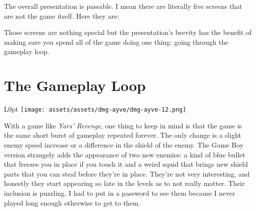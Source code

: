 \documentclass{book}
\let\oldcenter\center
\let\oldendcenter\endcenter
\renewenvironment{center}{\setlength\topsep{0pt}\oldcenter}{\oldendcenter}
\begin{document}
The overall presentation is passable. I mean there are literally five screens that are not the game itself. Here they are:

\begin{center}
\quad\vspace{4pt}
\quad\vspace{4pt}
\quad\vspace{4pt}
\quad\vspace{4pt}
\quad\vspace{4pt}
\end{center}

Those screens are nothing special but the presentation’s brevity has the benefit of making sure you spend all of the game doing one thing: going through the gameplay loop.

\FloatBarrier\needspace{10mm}\section*{The Gameplay Loop}\nopagebreak[4]

\begin{wrapfigure}{L}{0pt} \texttt{[image: assets/assets/dmg-ayve/dmg-ayve-12.png]}\end{wrapfigure}
With a game like \emph{Yars’ Revenge}, one thing to keep in mind is that the game is the same short burst of gameplay repeated forever. The only change is a slight enemy speed increase or a difference in the shield of the enemy. The Game Boy version strangely adds the appearance of two new enemies: a kind of blue bullet that freezes you in place if you touch it and a weird squid that brings new shield parts that you can steal before they’re in place. They’re not very interesting, and honestly they start appearing so late in the levels as to not really matter. Their inclusion is puzzling. I had to put in a password to see them because I never played long enough otherwise to get to them.

\begin{center}
\quad\vspace{4pt}
\quad\vspace{4pt}
\end{center}
\end{document}
